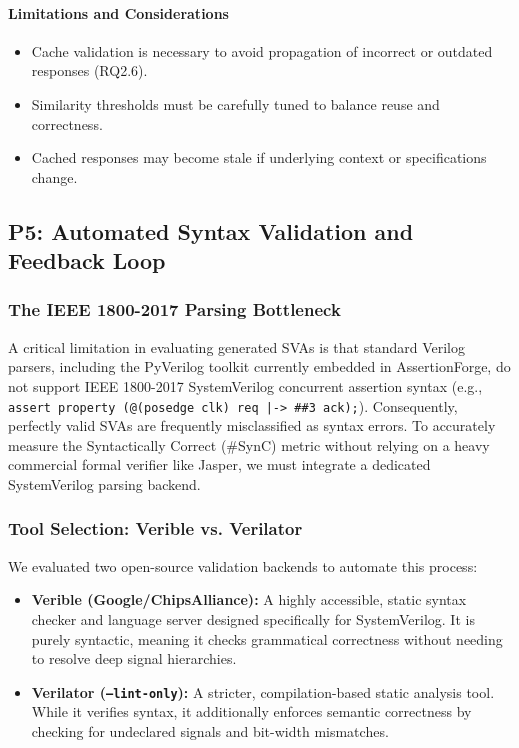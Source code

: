 \documentclass[12pt,a4paper]{article}
\begin{document}
\paragraph{Limitations and Considerations}

\begin{itemize}
\item Cache validation is necessary to avoid propagation of incorrect or outdated responses (RQ2.6).
\item Similarity thresholds must be carefully tuned to balance reuse and correctness.
\item Cached responses may become stale if underlying context or specifications change.
\end{itemize}


\subsection{P5: Automated Syntax Validation and Feedback Loop}

\subsubsection{The IEEE 1800-2017 Parsing Bottleneck}

A critical limitation in evaluating generated SVAs is that standard Verilog parsers, including the PyVerilog toolkit currently embedded in AssertionForge, do not support IEEE 1800-2017 SystemVerilog concurrent assertion syntax (e.g., \texttt{assert property (@(posedge clk) req |-> \#\#3 ack);}). Consequently, perfectly valid SVAs are frequently misclassified as syntax errors. To accurately measure the Syntactically Correct (\#SynC) metric without relying on a heavy commercial formal verifier like Jasper, we must integrate a dedicated SystemVerilog parsing backend.

\subsubsection{Tool Selection: Verible vs. Verilator}

We evaluated two open-source validation backends to automate this process:
\begin{itemize}[leftmargin=*, noitemsep]
  \item \textbf{Verible (Google/ChipsAlliance):} A highly accessible, static syntax checker and language server designed specifically for SystemVerilog. It is purely syntactic, meaning it checks grammatical correctness without needing to resolve deep signal hierarchies.
  \item \textbf{Verilator (\texttt{--lint-only}):} A stricter, compilation-based static analysis tool. While it verifies syntax, it additionally enforces semantic correctness by checking for undeclared signals and bit-width mismatches.
\end{itemize}
\end{document}
